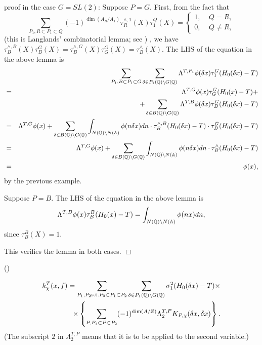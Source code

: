 proof in the case $G=SL(2)$: Suppose $P=G$. First, from the fact that 
\begin{equation}\label{eq:5.17}
\sum_{ P_1 , R\subset P_1\subset Q}
 (-1)^{\dim (A_R/A_1)}\tau_R^{\wedge ,1}(X)\tau _1^Q(X)
=\left\{ 
\begin{array}{c}
1,\;\;\;\;Q=R, \\ 
0,\;\;\;\;Q\neq R,
\end{array}
\right.
\end{equation}
(this is Langlands' combinatorial lemma; see \cite{A3})
, we have $\tau
_B^{\wedge ,B}(X)\tau _B^G(X)=\tau _B^{\wedge ,G}(X)\tau _G^G(X)=\tau
_B^{\wedge }(X)$. The LHS of the equation in the above lemma is 
\begin{eqnarray*}
&&\sum_{ P_1, B\subset P_1\subset G } 
\sum_{\delta \in P_1(\qqq )\backslash G(\qqq )}
\Lambda ^{T,P_1}\phi (\delta x)\tau _1^G(H_0(\delta x)-T) \\
&=&\Lambda ^{T,G}\phi (x)\tau _G^G(H_0(x)-T)+ \\
&&+\sum_{\delta \in B(\qqq )\backslash G(\qqq )}\Lambda ^{T,B}\phi
(\delta x)\tau _B^G(H_0(\delta x)-T) \\
&=&\Lambda ^{T,G}\phi (x)+\sum_{\delta \in B(\qqq )\backslash G(\qqq %
)}\int_{N(\qqq )\backslash N(\aaa )}\phi (n\delta x)dn\cdot \tau
_B^{\wedge ,B}(H_0(\delta x)-T)\cdot \tau _B^G(H_0(\delta x)-T) \\
&=&\Lambda ^{T,G}\phi (x)+\sum_{\delta \in B(\qqq )\backslash G(\qqq %
)}\int_{N(\qqq )\backslash N(\aaa )}\phi (n\delta x)dn\cdot \tau
_B^{\wedge }(H_0(\delta x)-T) \\
&=&\phi (x),
\end{eqnarray*}
by the previous example.

Suppose $P=B$. The LHS of the equation in the above lemma is 
\[
\Lambda ^{T,B}\phi (x)\tau _B^B(H_0(x)-T)
=\int_{N(\mathbb{Q} )\backslash N(\mathbb{A})}\phi (nx)dn, 
\]
since $\tau _B^B(X)=1$.

This verifies the lemma in both cases. $\Box $

\begin{lemma}\label{lem:5.15}
(\cite[Lemma 2.2]{A3})

\begin{eqnarray*}
k_\chi ^T(x,f)=\sum_{ P_1,P_2 {\rm s.t.} P_0\subset P_1\subset P_2}
\sum_{\delta \in P_1(\mathbb{Q} )\backslash G(\mathbb{Q} )}
\sigma _1^2(H_0(\delta x)-T)\times  \\
\times \left\{ \sum_{ P, P_1\subset P\subset P_2 }
(-1)^{\dim (A/Z)}\Lambda _2^{T,P}K_{P,\chi }(\delta x,\delta x)\right\} .
\end{eqnarray*}
(The subscript $2$ in $\Lambda _2^{T,P}$ means that it is to be applied to
the second variable.)
\end{lemma}

